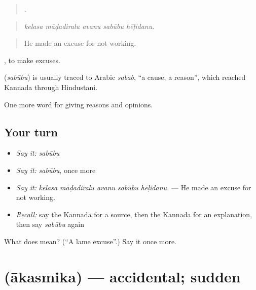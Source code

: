 \begin{quote}
    .
\end{quote}

\begin{quote}
\emph{kelasa māḍadiralu avanu sabūbu hēḷidanu.}
\end{quote}

\begin{quote}
He made an excuse for not working.
\end{quote}

 , to make excuses.

\begin{cousinweb}
\textbf{} (\emph{sabūbu}) is usually traced to Arabic \emph{sabab}, \textquotedblleft{}a cause, a reason\textquotedblright{}, which reached Kannada through Hindustani.
\end{cousinweb}

\begin{grammarlens}[title={What you've built}]
One more word for giving reasons and opinions.
\end{grammarlens}

\subsection*{Your turn}
\begin{itemize}
\raggedright
  \item \emph{Say it:} \emph{sabūbu}
  \item \emph{Say it:} \emph{sabūbu}, once more
  \item \emph{Say it:} \emph{kelasa māḍadiralu avanu sabūbu hēḷidanu.} — He made an excuse for not working.
  \item \emph{Recall:} say the Kannada for a source, then the Kannada for an explanation, then say \emph{sabūbu} again
\end{itemize}

\begin{tcolorbox}[breakable,colback=teal!4,colframe=teal!35!black,title={Before you move on}]
What does  mean? (\textquotedblleft{}A lame excuse\textquotedblright{}.) Say it once more.
\end{tcolorbox}
\section[\texorpdfstring{\kn{ಆಕಸ್ಮಿಕ} (ākasmika)}{ಆಕಸ್ಮಿಕ (ākasmika)}]{ (ākasmika) — accidental; sudden}

